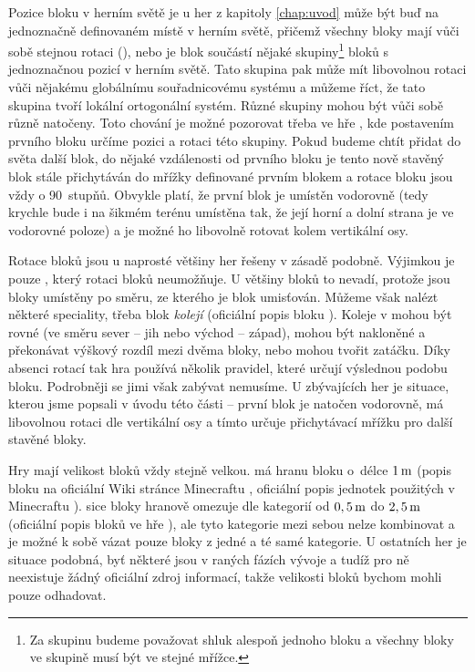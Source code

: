 Pozice bloku v herním světě je u her z kapitoly \ref{chap:uvod} může být buď na jednoznačně definovaném místě v herním světě, přičemž všechny bloky mají vůči sobě stejnou rotaci (\MC{}), nebo je blok součástí nějaké skupiny\footnote{Za skupinu budeme považovat shluk alespoň jednoho bloku a všechny bloky ve skupině musí být ve stejné mřížce.} bloků s jednoznačnou pozicí v herním světě. Tato skupina pak může mít libovolnou rotaci vůči nějakému globálnímu souřadnicovému systému a můžeme říct, že tato skupina tvoří lokální ortogonální systém. Různé skupiny mohou být vůči sobě různě natočeny. Toto chování je možné pozorovat třeba ve hře \ME{}, kde postavením prvního bloku určíme pozici a rotaci této skupiny. Pokud budeme chtít přidat do světa další blok, do nějaké vzdálenosti od prvního bloku je tento nově stavěný blok stále přichytáván do mřížky definované prvním blokem a rotace bloku jsou vždy o 90~stupňů. Obvykle platí, že první blok je umístěn vodorovně (tedy krychle bude i na šikmém terénu umístěna tak, že její horní a dolní strana je ve vodorovné poloze) a je možné ho libovolně rotovat kolem vertikální osy.

Rotace bloků jsou u naprosté většiny her řešeny v zásadě podobně. Výjimkou je pouze \MC{}, který rotaci bloků neumožňuje. U většiny bloků to nevadí, protože jsou bloky umístěny po směru, ze kterého je blok umisťován. Můžeme však nalézt některé speciality, třeba blok \textit{kolejí} (oficiální popis bloku \citep{mc_rail}). Koleje v  mohou být rovné (ve směru sever -- jih nebo východ -- západ), mohou být nakloněné a překonávat výškový rozdíl mezi dvěma bloky, nebo mohou tvořit zatáčku. Díky absenci rotací tak hra používá několik pravidel, které určují výslednou podobu bloku. Podrobněji se jimi však zabývat nemusíme. U zbývajících her je situace, kterou jsme popsali v úvodu této části -- první blok je natočen vodorovně, má libovolnou rotaci dle vertikální osy a tímto určuje přichytávací mřížku pro další stavěné bloky.

Hry mají velikost bloků vždy stejně velkou. \MC{} má hranu bloku o~délce $1\,\rm m$ (popis bloku na oficiální Wiki stránce Minecraftu \citep{mc_block}, oficiální popis jednotek použitých v Minecraftu \citep{mc_units}). \SE{} sice bloky hranově omezuje dle kategorií od $0,5\,\rm m$ do $2,5\,\rm m$ (oficiální popis bloků ve hře \citep{se_blocks_wiki}), ale tyto kategorie mezi sebou nelze kombinovat a je možné k sobě vázat pouze bloky z jedné a té samé kategorie. U ostatních her je situace podobná, byť některé jsou v raných fázích vývoje a tudíž pro ně neexistuje žádný oficiální zdroj informací, takže velikosti bloků bychom mohli pouze odhadovat. 

